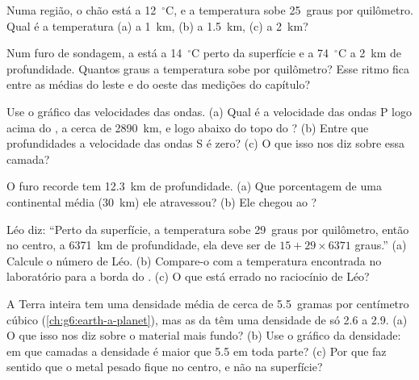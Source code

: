 \begin{exercise}[$\star\star$]\label{exo:g6:inside-the-earth:7}
Numa região, o chão está a 12~$^\circ$C, e a temperatura sobe 25~graus por
quilômetro. Qual é a temperatura (a) a 1~km, (b) a 1.5~km, (c) a 2~km?
\end{exercise}

\begin{exercise}[$\star\star$]\label{exo:g6:inside-the-earth:8}
Num furo de sondagem, a  está a 14~$^\circ$C perto da superfície e a
74~$^\circ$C a 2~km de profundidade. Quantos graus a temperatura sobe por
quilômetro? Esse ritmo fica entre as médias do leste e do oeste das
medições do capítulo?
\end{exercise}

\begin{exercise}[$\star\star$]\label{exo:g6:inside-the-earth:9}
Use o gráfico das velocidades das ondas. (a) Qual é a velocidade das ondas
P logo acima do , a cerca de 2890~km, e logo abaixo do topo do
? (b) Entre que profundidades a velocidade das ondas S é zero? (c) O
que isso nos diz sobre essa camada?
\end{exercise}

\begin{exercise}[$\star\star$]\label{exo:g6:inside-the-earth:10}
O furo recorde tem 12.3~km de profundidade. (a) Que porcentagem de uma
 continental média (30~km) ele atravessou? (b) Ele chegou ao ?
\end{exercise}

\begin{exercise}[$\star\star\star$]\label{exo:g6:inside-the-earth:11}
Léo diz: ``Perto da superfície, a temperatura sobe 29~graus por
quilômetro, então no centro, a 6371~km de profundidade, ela deve ser de
$15 + 29 \times 6371$ graus.'' (a) Calcule o número de Léo. (b) Compare-o
com a temperatura encontrada no laboratório para a borda do . (c) O que está errado no raciocínio de Léo?
\end{exercise}

\begin{exercise}[$\star\star\star$]\label{exo:g6:inside-the-earth:12}
A Terra inteira tem uma densidade média de cerca de 5.5~gramas por
centímetro cúbico (\cref{ch:g6:earth-a-planet}), mas as  da 
têm uma densidade de só 2.6 a 2.9. (a) O que isso nos diz sobre o material
mais fundo? (b) Use o gráfico da densidade: em que camadas a densidade é maior que 5.5 em toda parte? (c) Por que faz sentido que o metal pesado fique no
centro, e não na superfície?
\end{exercise}

